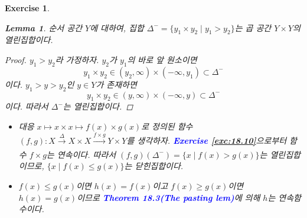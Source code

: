 \documentclass{article}
\newtheorem{exercise}{Exercise}[section]
\newtheorem*{lem}{Lemma}
\begin{document}
\begin{exercise}
    \begin{lem}
        순서 공간 $Y$에 대하여, 집합 $\Delta^-=\{y_1\times y_2\mid y_1>y_2\}$는 곱 공간 $Y\times Y$의 열린집합이다.
    \end{lem}
    \begin{proof}
        $y_1>y_2$라 가정하자. $y_2$가 $y_1$의 바로 앞 원소이면
        \begin{equation*}
            y_1\times y_2\in(y_2,\infty)\times(-\infty,y_1)\subset\Delta^-
        \end{equation*}
        이다. $y_1>y>y_2$인 $y\in Y$가 존재하면
        \begin{equation*}
            y_1\times y_2\in(y,\infty)\times (-\infty,y)\subset\Delta^-
        \end{equation*}
        이다. 따라서 $\Delta^-$는 열린집합이다.
    \end{proof}
    \begin{itemize}
        \item[(a)] 대응 $x\mapsto x\times x\mapsto f(x)\times g(x)$로 정의된 함수 $(f,g):X\xrightarrow[]{\Delta}X\times X\xrightarrow[]{f\times g} Y\times Y$를 생각하자. \textcolor{blue}{\textbf{Exercise \ref{exc:18.10}}}으로부터 함수 $f\times g$는 연속이다. 따라서 $(f,g)(\Delta^-)=\{x\mid f(x)>g(x)\}$는 열린집합이므로, $\{x\mid f(x)\leq g(x)\}$는 닫힌집합이다.
        \item[(b)] $f(x)\leq g(x)$이면 $h(x)=f(x)$이고 $f(x)\geq g(x)$이면 $h(x)=g(x)$이므로 \textcolor{blue}{\textbf{Theorem 18.3(The pasting lem)}}에 의해 $h$는 연속함수이다.
    \end{itemize}
\end{exercise}
\end{document}
